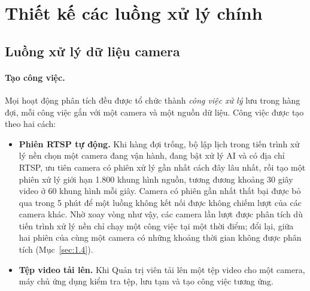 \section{Thiết kế các luồng xử lý chính}
\label{sec:5.2}

\subsection{Luồng xử lý dữ liệu camera}
\label{sec:5.2.1}

\paragraph{Tạo công việc.} Mọi hoạt động phân tích đều được tổ chức thành \emph{công việc xử lý} lưu trong hàng đợi, mỗi công việc gắn với một camera và một nguồn dữ liệu. Công việc được tạo theo hai cách:
\begin{itemize}
    \item \textbf{Phiên RTSP tự động.} Khi hàng đợi trống, bộ lập lịch trong tiến trình xử lý nền chọn một camera đang vận hành, đang bật xử lý AI và có địa chỉ RTSP, ưu tiên camera có phiên xử lý gần nhất cách đây lâu nhất, rồi tạo một phiên xử lý giới hạn 1.800 khung hình nguồn, tương đương khoảng 30 giây video ở 60 khung hình mỗi giây. Camera có phiên gần nhất thất bại được bỏ qua trong 5 phút để một luồng không kết nối được không chiếm lượt của các camera khác. Nhờ xoay vòng như vậy, các camera lần lượt được phân tích dù tiến trình xử lý nền chỉ chạy một công việc tại một thời điểm; đổi lại, giữa hai phiên của cùng một camera có những khoảng thời gian không được phân tích (Mục~\ref{sec:1.4}).
    \item \textbf{Tệp video tải lên.} Khi Quản trị viên tải lên một tệp video cho một camera, máy chủ ứng dụng kiểm tra tệp, lưu tạm và tạo công việc tương ứng.
\end{itemize}

